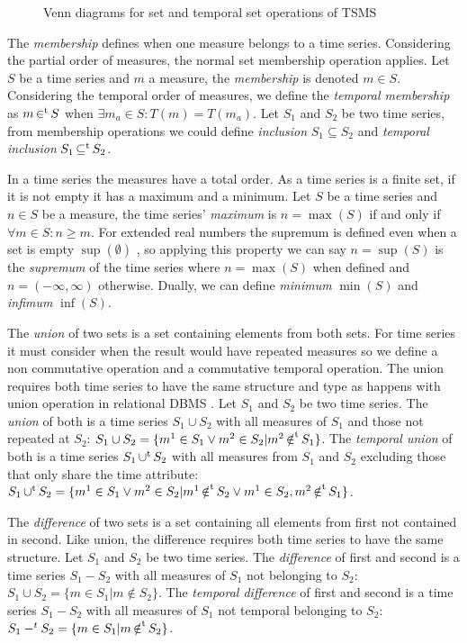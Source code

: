 \begin{figure}
  \centering
  
  \caption{Venn diagrams for set and temporal set operations of TSMS}
  \label{fig:model:venn}
\end{figure}


The \emph{membership} defines when one measure belongs to a time
series. Considering the partial order of measures, the normal set
membership operation applies. Let $S$ be a time series and $m$ a
measure, the \emph{membership} is denoted $m \in S$. Considering the
temporal order of measures, we define the \emph{temporal membership}
as $m \operatorname*{\in^t} S$ when $\exists m_a \in S : T(m) = T(m_a)$.  Let $S_1$
and $S_2$ be two time series, from membership operations we could
define \emph{inclusion} $S_1\subseteq S_2$ and \emph{temporal
  inclusion} $S_1\operatorname*{\subseteq^t} S_2$.


In a time series the measures have a total order.  As a time series is
a finite set, if it is not empty it has a maximum and a minimum.  Let
$S$ be a time series and $n\in S$ be a measure, the time series'
\emph{maximum} is $n=\max(S)$ if and only if $\forall m \in S: n \geq
m $.  For extended real numbers the supremum is defined even when a
set is empty $\sup(\emptyset)$ \cite{cantrell:extendedreal}, so
applying this property we can say $n=\sup(S)$ is the \emph{supremum}
of the time series where $n=\max(S)$ when defined and
$n=(-\infty,\infty)$ otherwise.
Dually, we can define \emph{minimum} $\min(S)$ and \emph{infimum} $\inf(S)$.



The \emph{union} of two sets is a set containing elements from both
sets. For time series it must consider when the result would have
repeated measures so we define a non commutative operation and a
commutative temporal operation. The union requires both time series to
have the same structure and type as happens with union operation in
relational DBMS \cite{date:introduction}. %
Let $S_1$ and $S_2$ be two time series. The \emph{union} of both is a
time series $S_1 \cup S_2$ with all measures of $S_1$ and those not
repeated at $S_2$: $S_1 \cup S_2 = \{m^1 \in S_1 \vee m^2 \in S_2 |
m^2 \operatorname*{\notin^t} S_1 \}$. The \emph{temporal union} of both is a time
series $S_1 \operatorname*{\cup^t} S_2$ with all measures from $S_1$ and $S_2$
excluding those that only share the time attribute: $S_1 \operatorname*{\cup^t} S_2 =
\{ m^1 \in S_1 \vee m^2 \in S_2 | m^1 \operatorname*{\notin^t} S_2 \vee m^1 \in S_2,
m^2 \operatorname*{\notin^t} S_1 \}$.



The \emph{difference} of two sets is a set containing all elements
from first not contained in second. Like union, the difference
requires both time series to have the same structure. %
Let $S_1$ and $S_2$ be two time series. The \emph{difference} of first
and second is a time series $S_1 - S_2$ with all measures of $S_1$ not
belonging to $S_2$: $S_1 \cup S_2 = \{ m \in S_1 | m \notin S_2
\}$. The \emph{temporal difference} of first and second is a time
series $S_1 - S_2$ with all measures of $S_1$ not temporal belonging
to $S_2$: $S_1 -^t S_2 = \{ m \in S_1 | m \operatorname*{\notin^t} S_2 \}$.


